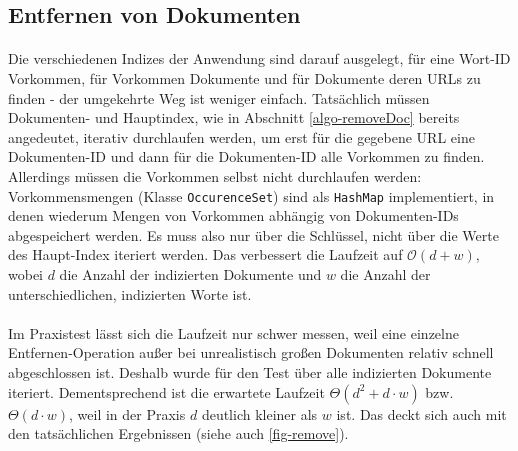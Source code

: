 \subsection{Entfernen von Dokumenten}
\label{compl-remove}

\paragraph{} Die verschiedenen Indizes der Anwendung sind darauf ausgelegt, für eine Wort-ID Vorkommen, für Vorkommen Dokumente und für Dokumente deren URLs zu finden - der umgekehrte Weg ist weniger einfach. Tatsächlich müssen Dokumenten- und Hauptindex, wie in Abschnitt \ref{algo-removeDoc} bereits angedeutet, iterativ durchlaufen werden, um erst für die gegebene URL eine Dokumenten-ID und dann für die Dokumenten-ID alle Vorkommen zu finden. Allerdings müssen die Vorkommen selbst nicht durchlaufen werden: Vorkommensmengen (Klasse \texttt{OccurenceSet}) sind als \texttt{HashMap} implementiert, in denen wiederum Mengen von Vorkommen abhängig von Dokumenten-IDs abgespeichert werden. Es muss also nur über die Schlüssel, nicht über die Werte des Haupt-Index iteriert werden. Das verbessert die Laufzeit auf $\mathcal{O}(d + w)$, wobei $d$ die Anzahl der indizierten Dokumente und $w$ die Anzahl der unterschiedlichen, indizierten Worte ist.
\paragraph{} Im Praxistest lässt sich die Laufzeit nur schwer messen, weil eine einzelne Entfernen-Operation außer bei unrealistisch großen Dokumenten relativ schnell abgeschlossen ist. Deshalb wurde für den Test über alle indizierten Dokumente iteriert. Dementsprechend ist die erwartete Laufzeit $\Theta(d^2 + d \cdot w)$ bzw. $\Theta(d \cdot w)$, weil in der Praxis $d$ deutlich kleiner als $w$ ist. Das deckt sich auch mit den tatsächlichen Ergebnissen (siehe auch \ref{fig-remove}).


